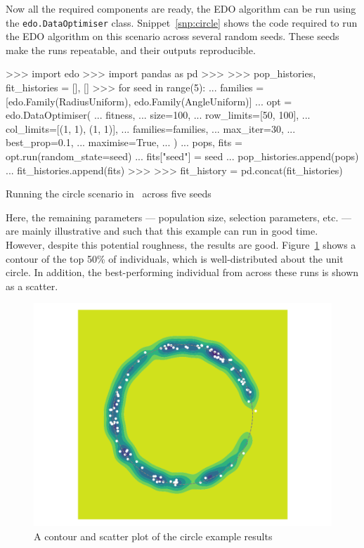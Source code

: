 Now all the required components are ready, the EDO algorithm can be run
using the \texttt{edo.DataOptimiser} class.
Snippet~\ref{snp:circle} shows the code required to run the EDO algorithm on
this scenario across several random seeds. These seeds make the runs repeatable,
and their outputs reproducible.

\begin{listing}[htbp]
\begin{usagepy}
>>> import edo
>>> import pandas as pd
>>> 
>>> pop_histories, fit_histories = [], []
>>> for seed in range(5):
...     families = [edo.Family(RadiusUniform), edo.Family(AngleUniform)]
...     opt = edo.DataOptimiser(
...         fitness,
...         size=100,
...         row_limits=[50, 100],
...         col_limits=[(1, 1), (1, 1)],
...         families=families,
...         max_iter=30,
...         best_prop=0.1,
...         maximise=True,
...     )
...     pops, fits = opt.run(random_state=seed)
...     fits["seed"] = seed
...     pop_histories.append(pops)
...     fit_histories.append(fits)
>>> 
>>> fit_history = pd.concat(fit_histories)

\end{usagepy}
\caption{Running the circle scenario in \edo\ across five seeds}
\label{snp:circle}
\end{listing}

Here, the remaining parameters --- population size, selection parameters, etc.
--- are mainly illustrative and such that this example can run in good time.
However, despite this potential roughness, the results are good.
Figure~\ref{fig:circle} shows a contour of the top 50\% of individuals, which is
well-distributed about the unit circle. In addition, the best-performing
individual from across these runs is shown as a scatter.

\begin{figure}
    \centering
    \includegraphics[width=\imgwidth]{img/circle/main}
    \caption{A contour and scatter plot of the circle example results}
    \label{fig:circle}
\end{figure}
\graphicspath{{chapters/edo/paper/img/}}

